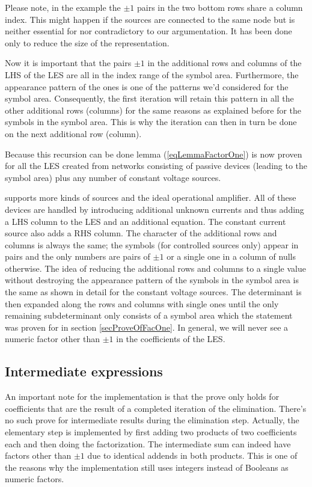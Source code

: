 Please note, in the example the $\pm 1$ pairs in the two bottom rows share
a column index. This might happen if the sources are connected to the same
node but is neither essential for nor contradictory to our argumentation.
It has been done only to reduce the size of the representation.

Now it is important that the pairs $\pm 1$ in the additional rows and
columns of the LHS of the LES are all in the index range of the symbol
area. Furthermore, the appearance pattern of the ones is one of the
patterns we'd considered for the symbol area. Consequently, the first
iteration will retain this pattern in all the other additional rows
(columns) for the same reasons as explained before for the symbols in the
symbol area. This is why the iteration can then in turn be done on the
next additional row (column).

Because this recursion can be done lemma (\ref{eqLemmaFactorOne}) is now
proven for all the LES created from networks consisting of passive devices
(leading to the symbol area) plus any number of constant voltage sources.

\linnet{} supports more kinds of sources and the ideal operational
amplifier. All of these devices are handled by introducing additional
unknown currents and thus adding a LHS column to the LES and an additional
equation. The constant current source also adds a RHS column. The
character of the additional rows and columns is always the same; the
symbols (for controlled sources only) appear in pairs and the only numbers
are pairs of $\pm 1$ or a single one in a column of nulls otherwise. The
idea of reducing the additional rows and columns to a single value without
destroying the appearance pattern of the symbols in the symbol area is the
same as shown in detail for the constant voltage sources. The determinant
is then expanded along the rows and columns with single ones until the
only remaining subdeterminant only consists of a symbol area which the
statement was proven for in section \ref{secProveOfFacOne}. In general, we
will never see a numeric factor other than $\pm 1$ in the coefficients of
the LES.


\subsection{Intermediate expressions}

An important note for the implementation is that the prove only holds for
coefficients that are the result of a completed iteration of the
elimination. There's no such prove for intermediate results during the
elimination step. Actually, the elementary step is implemented by first
adding two products of two coefficients each and then doing the
factorization. The intermediate sum can indeed have factors other than
$\pm 1$ due to identical addends in both products. This is one of the
reasons why the implementation still uses integers instead of Booleans as
numeric factors.

